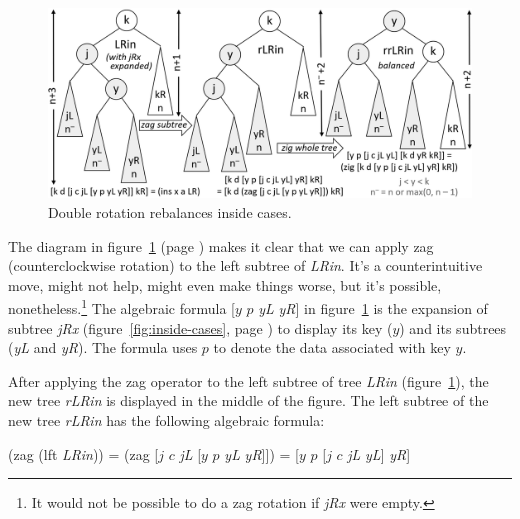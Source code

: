\begin{figure}
\begin{center}
\includegraphics[scale=1]{images-cmyk/dbl-rotation}
\end{center}
\caption{Double rotation rebalances inside cases.}
\label{fig:dbl-rotation}
\end{figure}

The diagram in figure~\ref{fig:dbl-rotation} (page \pageref{fig:dbl-rotation})
makes it clear that we can apply \textsf{zag}
(counterclockwise rotation)
to the left subtree of \emph{LRin}.
It's a counterintuitive move, might not help, might even make things worse,
but it's possible, nonetheless.\footnote{\label{no-zag}It would not be possible
to do a \textsf{zag} rotation if \emph{jRx} were empty.}
The algebraic formula \textsf{[$y$ $p$} \emph{yL} \emph{yR}\textsf{]} in figure~\ref{fig:dbl-rotation}
is the expansion of subtree \emph{jRx} 
(figure~\ref{fig:inside-cases}, page \pageref{fig:inside-cases}) 
to display its key ($y$) and its subtrees (\emph{yL} and \emph{yR}).
The formula uses $p$ to denote the data associated with key $y$.

After applying the \textsf{zag} operator to the left subtree of tree \emph{LRin}
(figure~\ref{fig:dbl-rotation}), the new tree \emph{rLRin} is displayed in
the middle of the figure. The left subtree of the new tree \emph{rLRin} has the following algebraic formula:
\begin{center}
\textsf{(zag (lft} \emph{LRin}\textsf{))} =
\textsf{(zag [$j$ $c$} \emph{jL} \textsf{[$y$ $p$} \emph{yL} \emph{yR}\textsf{]])} =
\textsf{[$y$ $p$ [$j$ $c$} \emph{jL} \emph{yL}\textsf{]} \emph{yR}\textsf{]}
\end{center}

